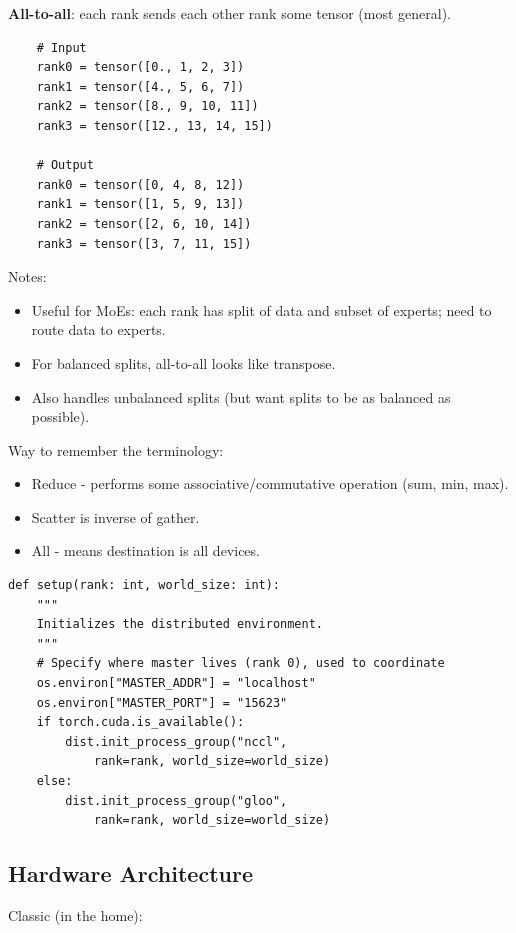 \documentclass[12pt,twoside]{article}
\begin{document}
\textbf{All-to-all}: each rank sends each other rank some tensor (most general).

\begin{verbatim}
    # Input
    rank0 = tensor([0., 1, 2, 3])    
    rank1 = tensor([4., 5, 6, 7])
    rank2 = tensor([8., 9, 10, 11])
    rank3 = tensor([12., 13, 14, 15])
    
    # Output
    rank0 = tensor([0, 4, 8, 12])
    rank1 = tensor([1, 5, 9, 13])
    rank2 = tensor([2, 6, 10, 14])
    rank3 = tensor([3, 7, 11, 15])
\end{verbatim}

Notes: 

\begin{itemize}
    \item Useful for MoEs: each rank has split of data and subset of experts; need to route data to experts.
    \item For balanced splits, all-to-all looks like transpose.
    \item Also handles unbalanced splits (but want splits to be as balanced as possible).
\end{itemize}

Way to remember the terminology:

\begin{itemize}
    \item Reduce - performs some associative/commutative operation (sum, min, max).
    \item Scatter is inverse of gather.
    \item All - means destination is all devices.
\end{itemize}

\begin{verbatim}
def setup(rank: int, world_size: int):
    """
    Initializes the distributed environment.
    """
    # Specify where master lives (rank 0), used to coordinate
    os.environ["MASTER_ADDR"] = "localhost"
    os.environ["MASTER_PORT"] = "15623"
    if torch.cuda.is_available():
        dist.init_process_group("nccl", 
            rank=rank, world_size=world_size)
    else:
        dist.init_process_group("gloo", 
            rank=rank, world_size=world_size)
\end{verbatim}

\subsection*{Hardware Architecture}

Classic (in the home):
\end{document}
